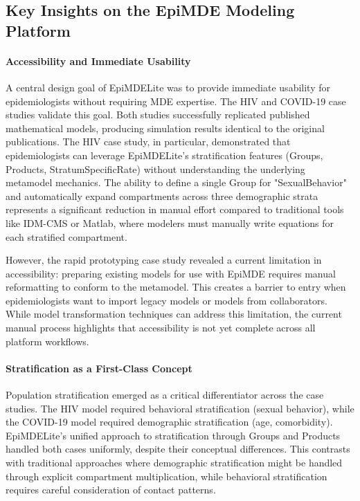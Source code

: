 \subsection{Key Insights on the EpiMDE Modeling Platform}

\paragraph{Accessibility and Immediate Usability}

A central design goal of EpiMDELite was to provide immediate usability for epidemiologists without requiring MDE expertise. The HIV and COVID-19 case studies validate this goal. Both studies successfully replicated published mathematical models, producing simulation results identical to the original publications. The HIV case study, in particular, demonstrated that epidemiologists can leverage EpiMDELite's stratification features (Groups, Products, StratumSpecificRate) without understanding the underlying metamodel mechanics. The ability to define a single Group for "SexualBehavior" and automatically expand compartments across three demographic strata represents a significant reduction in manual effort compared to traditional tools like IDM-CMS or Matlab, where modelers must manually write equations for each stratified compartment.

However, the rapid prototyping case study revealed a current limitation in accessibility: preparing existing models for use with EpiMDE requires manual reformatting to conform to the metamodel. This creates a barrier to entry when epidemiologists want to import legacy models or models from collaborators. While model transformation techniques can address this limitation, the current manual process highlights that accessibility is not yet complete across all platform workflows.

\paragraph{Stratification as a First-Class Concept}

Population stratification emerged as a critical differentiator across the case studies. The HIV model required behavioral stratification (sexual behavior), while the COVID-19 model required demographic stratification (age, comorbidity). EpiMDELite's unified approach to stratification through Groups and Products handled both cases uniformly, despite their conceptual differences. This contrasts with traditional approaches where demographic stratification might be handled through explicit compartment multiplication, while behavioral stratification requires careful consideration of contact patterns.

